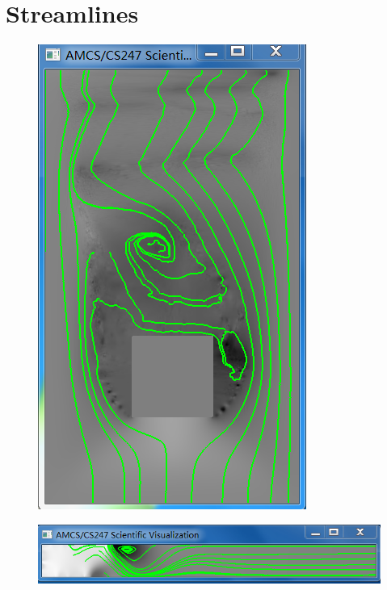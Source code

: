 \documentclass[12pt,letterpaper,fleqn]{article}          %
\begin{document}
\section{Streamlines}

\begin{figure}[!htb]
\centering
\includegraphics[scale=0.70]{1}
\end{figure}

\begin{figure}[!htb]
\centering
\includegraphics[scale=0.70]{2}
\end{figure}
\end{document}
